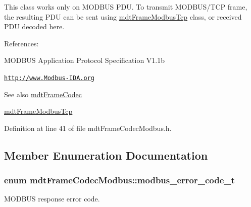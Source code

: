This class works only on MODBUS PDU. To transmit MODBUS/TCP frame, the resulting PDU can be sent using \hyperlink{classmdt_frame_modbus_tcp}{mdtFrameModbusTcp} class, or received PDU decoded here.

References:
\begin{DoxyItemize}
\item MODBUS Application Protocol Specification V1.1b
\item \href{http://www.Modbus-IDA.org}{\tt http://www.Modbus-\/IDA.org}
\end{DoxyItemize}

\begin{DoxySeeAlso}{See also}
\hyperlink{classmdt_frame_codec}{mdtFrameCodec} 

\hyperlink{classmdt_frame_modbus_tcp}{mdtFrameModbusTcp} 
\end{DoxySeeAlso}


Definition at line 41 of file mdtFrameCodecModbus.h.



\subsection{Member Enumeration Documentation}
\hypertarget{classmdt_frame_codec_modbus_a31d8291be7f8636d5d295ce3066d7ac7}{
\subsubsection[{modbus\_\-error\_\-code\_\-t}]{\setlength{\rightskip}{0pt plus 5cm}enum {\bf mdtFrameCodecModbus::modbus\_\-error\_\-code\_\-t}}}
\label{classmdt_frame_codec_modbus_a31d8291be7f8636d5d295ce3066d7ac7}


MODBUS response error code. 


